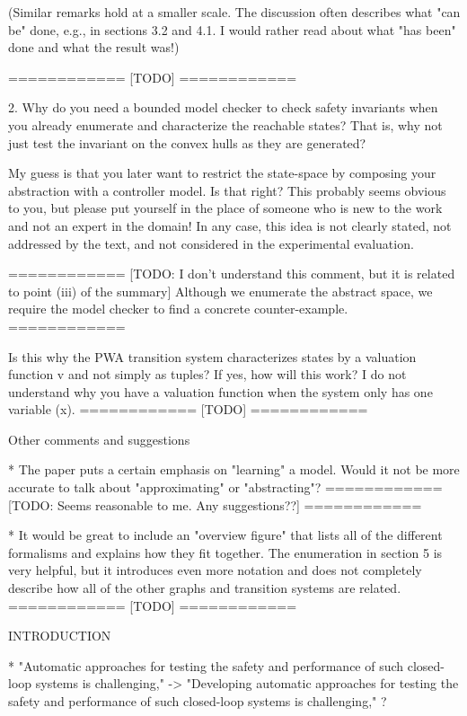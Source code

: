    (Similar remarks hold at a smaller scale. The discussion often describes
    what "can be" done, e.g., in sections 3.2 and 4.1. I would rather read
    about what "has been" done and what the result was!)
  
   ============
   [TODO]
   ============

2. Why do you need a bounded model checker to check safety invariants when
   you already enumerate and characterize the reachable states? That is, why
   not just test the invariant on the convex hulls as they are generated?

   My guess is that you later want to restrict the state-space by composing
   your abstraction with a controller model. Is that right? This probably
   seems obvious to you, but please put yourself in the place of someone who
   is new to the work and not an expert in the domain! In any case, this
   idea is not clearly stated, not addressed by the text, and not considered
   in the experimental evaluation.

   ============
   [TODO: I don't understand this comment, but it is related to
   point (iii) of the summary]
   Although we enumerate the abstract space, we require the model
   checker to find a concrete counter-example.
   ============

   Is this why the PWA transition system characterizes states by a valuation
   function v and not simply as tuples? If yes, how will this work? I do not
   understand why you have a valuation function when the system only has one
   variable (x).
   ============
   [TODO]
   ============

Other comments and suggestions

* The paper puts a certain emphasis on "learning" a model. Would it not be
  more accurate to talk about "approximating" or "abstracting"?
   ============
   [TODO: Seems reasonable to me. Any suggestions??]
   ============

* It would be great to include an "overview figure" that lists all of the
  different formalisms and explains how they fit together. The enumeration
  in section 5 is very helpful, but it introduces even more notation and
  does not completely describe how all of the other graphs and transition
  systems are related.
   ============
   [TODO]
   ============

INTRODUCTION

* "Automatic approaches for testing the safety and performance of such
closed-loop systems is challenging," ->
  "Developing automatic approaches for testing the safety and performance of
such closed-loop systems is challenging," ?

